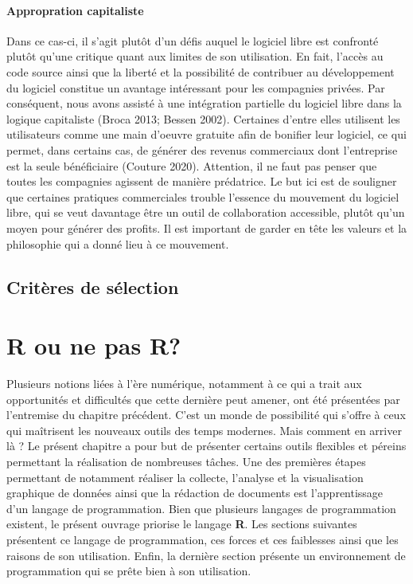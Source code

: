 \documentclass[
  letterpaper,
]{scrbook}
\begin{document}
\hypertarget{appropration-capitaliste}{%
\subsubsection{Appropration
capitaliste}\label{appropration-capitaliste}}

Dans ce cas-ci, il s'agit plutôt d'un défis auquel le logiciel libre est
confronté plutôt qu'une critique quant aux limites de son utilisation.
En fait, l'accès au code source ainsi que la liberté et la possibilité
de contribuer au développement du logiciel constitue un avantage
intéressant pour les compagnies privées. Par conséquent, nous avons
assisté à une intégration partielle du logiciel libre dans la logique
capitaliste (Broca 2013; Bessen 2002). Certaines d'entre elles utilisent
les utilisateurs comme une main d'oeuvre gratuite afin de bonifier leur
logiciel, ce qui permet, dans certains cas, de générer des revenus
commerciaux dont l'entreprise est la seule bénéficiaire (Couture 2020).
Attention, il ne faut pas penser que toutes les compagnies agissent de
manière prédatrice. Le but ici est de souligner que certaines pratiques
commerciales trouble l'essence du mouvement du logiciel libre, qui se
veut davantage être un outil de collaboration accessible, plutôt qu'un
moyen pour générer des profits. Il est important de garder en tête les
valeurs et la philosophie qui a donné lieu à ce mouvement.

\hypertarget{crituxe8res-de-suxe9lection}{%
\section{Critères de sélection}\label{crituxe8res-de-suxe9lection}}

\newpage{}


\hypertarget{sec-chap4}{%
\chapter{R ou ne pas R?}\label{sec-chap4}}

Plusieurs notions liées à l'ère numérique, notamment à ce qui a trait
aux opportunités et difficultés que cette dernière peut amener, ont été
présentées par l'entremise du chapitre précédent. C'est un monde de
possibilité qui s'offre à ceux qui maîtrisent les nouveaux outils des
temps modernes. Mais comment en arriver là ? Le présent chapitre a pour
but de présenter certains outils flexibles et péreins permettant la
réalisation de nombreuses tâches. Une des premières étapes permettant de
notamment réaliser la collecte, l'analyse et la visualisation graphique
de données ainsi que la rédaction de documents est l'apprentissage d'un
langage de programmation. Bien que plusieurs langages de programmation
existent, le présent ouvrage priorise le langage \textbf{R}. Les
sections suivantes présentent ce langage de programmation, ces forces et
ces faiblesses ainsi que les raisons de son utilisation. Enfin, la
dernière section présente un environnement de programmation qui se prête
bien à son utilisation.
\end{document}

